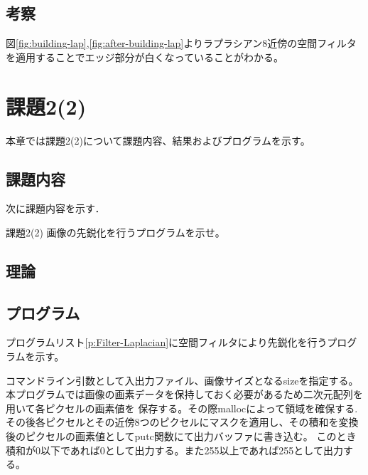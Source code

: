 \documentclass[11pt,a4paper,titlepage,dvipdfmx]{jarticle}
\begin{document}
  \subsection{考察}
    図\ref{fig:building-lap},\ref{fig:after-building-lap}よりラプラシアン8近傍の空間フィルタを適用することでエッジ部分が白くなっていることがわかる。

\section{課題2(2)}
  本章では課題2(2)について課題内容、結果およびプログラムを示す。
  \subsection{課題内容}
    次に課題内容を示す．
    \begin{itembox}[l]{課題2(2)}
      画像の先鋭化を行うプログラムを示せ。
    \end{itembox}
  \subsection{理論}
  \subsection{プログラム}
    プログラムリスト\ref{p:Filter-Laplacian}に空間フィルタにより先鋭化を行うプログラムを示す。
    

    コマンドライン引数として入出力ファイル、画像サイズとなるsizeを指定する。本プログラムでは画像の画素データを保持しておく必要があるため二次元配列を用いて各ピクセルの画素値を
    保存する。その際mallocによって領域を確保する.その後各ピクセルとその近傍8つのピクセルにマスクを適用し、その積和を変換後のピクセルの画素値としてputc関数にて出力バッファに書き込む。
    このとき積和が0以下であれば0として出力する。また255以上であれば255として出力する。
  
\end{document}
